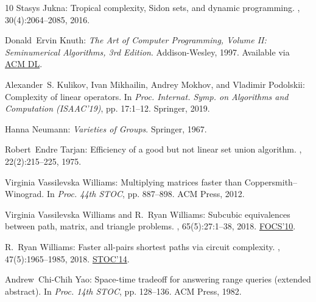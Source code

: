 \begin{thebibliography}{10}
{\sc Stasys Jukna}: Tropical complexity, {Sidon} sets, and dynamic programming.
, 30(4):2064--2085, 2016.
\newblock [\epfmtdoi{10.1137/16M1064738}]

{\sc Donald~Ervin Knuth}: {\em The Art of Computer Programming, Volume {II:}
  Seminumerical Algorithms, 3rd Edition}.
\newblock Addison-Wesley, 1997.
\newblock Available via \href{https://dl.acm.org/doi/10.5555/270146}{ACM DL}.

{\sc Alexander~S. Kulikov, Ivan Mikhailin, Andrey Mokhov, and Vladimir
  Podolskii}: Complexity of linear operators.
\newblock In {\em Proc. Internat. Symp. on Algorithms and Computation
  (ISAAC'19)}, pp. 17:1--12. Springer, 2019.

{\sc Hanna Neumann}: {\em Varieties of Groups}.
\newblock Springer, 1967.
\newblock [\epfmtdoi{10.1007/978-3-642-88599-0}]

{\sc Robert~Endre Tarjan}: Efficiency of a good but not linear set union
  algorithm.
, 22(2):215--225, 1975.
\newblock [\epfmtdoi{10.1145/321879.321884}]

{\sc Virginia {Vassilevska Williams}}: Multiplying matrices faster than
  {C}oppersmith--{W}inograd.
\newblock In {\em Proc. 44th STOC}, pp. 887--898. ACM Press, 2012.
\newblock [\epfmtdoi{10.1145/2213977.2214056}]

{\sc Virginia {Vassilevska Williams} and R.~Ryan Williams}: Subcubic
  equivalences between path, matrix, and triangle problems.
, 65(5):27:1--38, 2018.
\newblock \prelim \href{https://doi.org/10.1109/FOCS.2010.67}{FOCS'10}.
\newblock [\epfmtdoi{10.1145/3186893}]

{\sc R.~Ryan Williams}: Faster all-pairs shortest paths via circuit complexity.
, 47(5):1965--1985, 2018.
\newblock \prelim \href{https://doi.org/10.1145/2591796.2591811}{STOC'14}.
\newblock [\epfmtdoi{10.1137/15M1024524}]

{\sc Andrew~Chi{-}Chih Yao}: Space-time tradeoff for answering range queries
  (extended abstract).
\newblock In {\em Proc. 14th STOC}, pp. 128--136. ACM Press, 1982.
\newblock [\epfmtdoi{10.1145/800070.802185}]

\end{thebibliography}